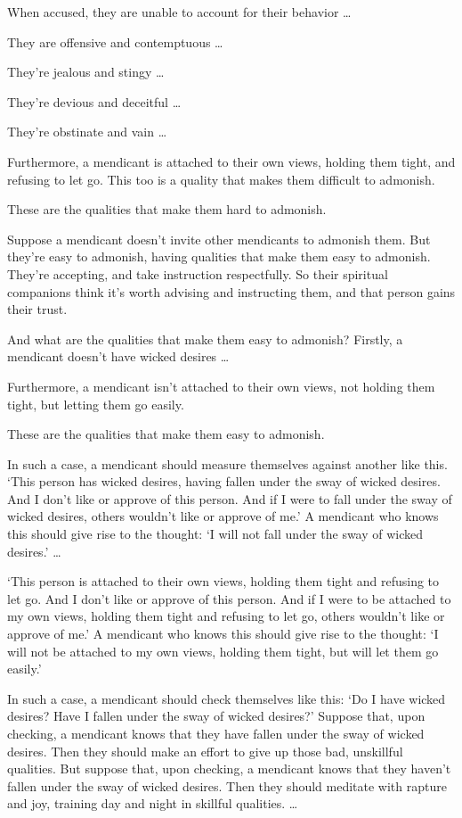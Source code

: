 \documentclass[12pt,openany]{book}%
\begin{document}
When accused, they are unable to account for their behavior … 

They are offensive and contemptuous … 

They’re jealous and stingy … 

They’re devious and deceitful … 

They’re obstinate and vain … 

Furthermore, a mendicant is attached to their own views, holding them tight, and refusing to let go. This too is a quality that makes them difficult to admonish. 

These are the qualities that make them hard to admonish. 

Suppose a mendicant doesn’t invite other mendicants to admonish them. But they’re easy to admonish, having qualities that make them easy to admonish. They're accepting, and take instruction respectfully. So their spiritual companions think it’s worth advising and instructing them, and that person gains their trust. 

And what are the qualities that make them easy to admonish? Firstly, a mendicant doesn’t have wicked desires … 

Furthermore, a mendicant isn’t attached to their own views, not holding them tight, but letting them go easily. 

These are the qualities that make them easy to admonish. 

In such a case, a mendicant should measure themselves against another like this. ‘This person has wicked desires, having fallen under the sway of wicked desires. And I don’t like or approve of this person. And if I were to fall under the sway of wicked desires, others wouldn’t like or approve of me.’ A mendicant who knows this should give rise to the thought: ‘I will not fall under the sway of wicked desires.’ … 

‘This person is attached to their own views, holding them tight and refusing to let go. And I don’t like or approve of this person. And if I were to be attached to my own views, holding them tight and refusing to let go, others wouldn’t like or approve of me.’ A mendicant who knows this should give rise to the thought: ‘I will not be attached to my own views, holding them tight, but will let them go easily.’ 

In such a case, a mendicant should check themselves like this: ‘Do I have wicked desires? Have I fallen under the sway of wicked desires?’ Suppose that, upon checking, a mendicant knows that they have fallen under the sway of wicked desires. Then they should make an effort to give up those bad, unskillful qualities. But suppose that, upon checking, a mendicant knows that they haven’t fallen under the sway of wicked desires. Then they should meditate with rapture and joy, training day and night in skillful qualities. … 
\end{document}
